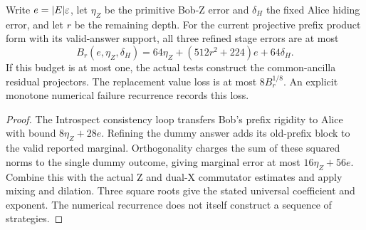 \begin{lemma}
\label{lem:intro-game-stage}
\leanok
Write $e=|E|\varepsilon$, let $\eta_Z$ be the primitive Bob-Z error and $\delta_H$
the fixed Alice hiding error, and let $r$ be the remaining depth. For the
current projective prefix product form with its valid-answer support, all three
refined stage errors are at most
\[
  B_r(e,\eta_Z,\delta_H)
   =64\eta_Z+(512r^2+224)e+64\delta_H.
\]
If this budget is at most one, the actual tests construct the common-ancilla
residual projectors. The replacement value loss is at most $8B_r^{1/8}$.
An explicit monotone numerical failure recurrence records this loss.
\end{lemma}
\begin{proof}
\leanok
The Introspect consistency loop transfers Bob's prefix rigidity to Alice
with bound $8\eta_Z+28e$. Refining the dummy answer adds its old-prefix
block to the valid reported marginal. Orthogonality charges the sum of
these squared norms to the single dummy outcome, giving marginal error
at most $16\eta_Z+56e$. Combine this with the actual Z and dual-X
commutator estimates and apply mixing and dilation. Three square roots
give the stated universal coefficient and exponent. The numerical
recurrence does not itself construct a sequence of strategies.
\end{proof}

